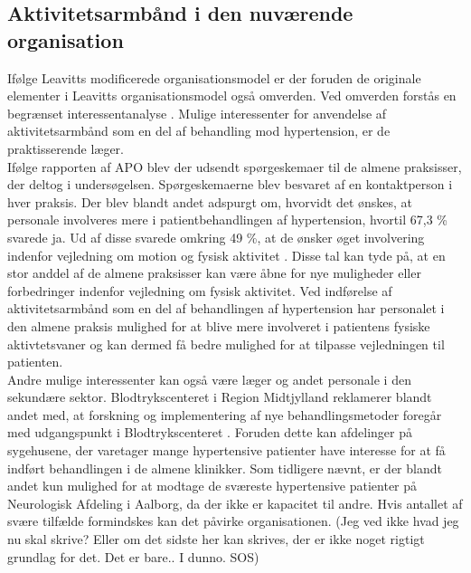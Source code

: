 \subsection{Aktivitetsarmbånd i den nuværende organisation}
Ifølge Leavitts modificerede organisationsmodel er der foruden de originale elementer i Leavitts organisationsmodel også omverden. Ved omverden forstås en begrænset interessentanalyse \citep{mtvhaandbog}. Mulige interessenter for anvendelse af aktivitetsarmbånd som en del af behandling mod hypertension, er de praktisserende læger. \\
Ifølge rapporten af APO blev der udsendt spørgeskemaer til de almene praksisser, der deltog i undersøgelsen. Spørgeskemaerne blev besvaret af en kontaktperson i hver praksis. Der blev blandt andet adspurgt om, hvorvidt det ønskes, at personale involveres mere i patientbehandlingen af hypertension, hvortil 67,3 \% svarede ja. Ud af disse svarede omkring 49 \%, at de ønsker øget involvering indenfor vejledning om motion og fysisk aktivitet \citep{munck2007}. Disse tal kan tyde på, at en stor anddel af de almene praksisser kan være åbne for nye muligheder eller forbedringer indenfor vejledning om fysisk aktivitet. Ved indførelse af aktivitetsarmbånd som en del af behandlingen af hypertension har personalet i den almene praksis mulighed for at blive mere involveret i patientens fysiske aktivtetsvaner og kan dermed få bedre mulighed for at tilpasse vejledningen til patienten. 
\\
Andre mulige interessenter kan også være læger og andet personale i den sekundære sektor. Blodtrykscenteret i Region Midtjylland reklamerer blandt andet med, at forskning og implementering af nye behandlingsmetoder foregår med udgangspunkt i Blodtrykscenteret \citep{aarhusuniversitetshospital}. Foruden dette kan afdelinger på sygehusene, der varetager mange hypertensive patienter have interesse for at få indført behandlingen i de almene klinikker. Som tidligere nævnt, er der blandt andet kun mulighed for at modtage de sværeste hypertensive patienter på Neurologisk Afdeling i Aalborg, da der ikke er kapacitet til andre. Hvis antallet af svære tilfælde formindskes kan det påvirke organisationen. (Jeg ved ikke hvad jeg nu skal skrive? Eller om det sidste her kan skrives, der er ikke noget rigtigt grundlag for det. Det er bare.. I dunno. SOS) 



